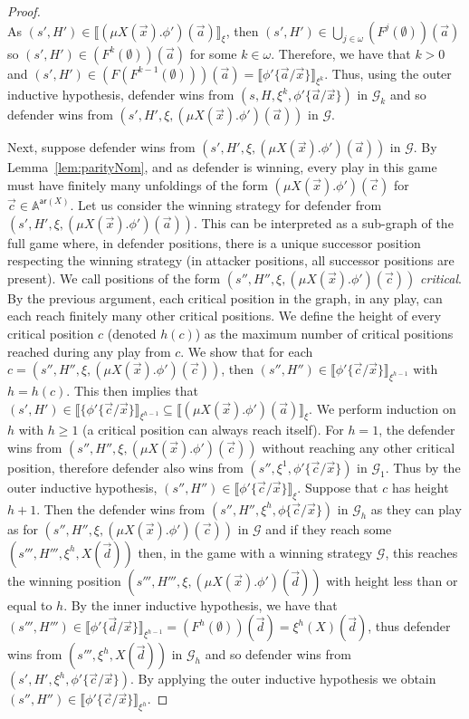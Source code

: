 \documentclass[10pt,a4paper]{article}
\theoremstyle{definition}
\theoremstyle{remark}
\newcommand\sem[2][\xi]{\llbracket#2\rrbracket_{#1}}
\newcommand\Gcal{\mathcal{G}}
\newcommand\Atoms{\mathbb{A}}
\newcommand\ar{\mathsf{ar}}
\begin{document}
\begin{proof}
	\\
	As $(s', H') \in \sem{(\mu X(\vec x).\phi')(\vec a)}$, then $(s', H') \in \bigcup_{j \in \omega} (F^j(\emptyset))(\vec a)$ so $(s', H') \in (F^k(\emptyset))(\vec a)$ for some $k \in \omega$. 
	Therefore, we have that $k > 0$ and $(s', H') \in (F(F^{k - 1}(\emptyset)))(\vec a) = \sem[\xi^k]{\phi'\{\vec a / \vec x\}}$.
	Thus, using the outer inductive hypothesis, defender wins from $(s, H, \xi^k, \phi'\{\vec a / \vec x\})$ in $\Gcal_k$ and so defender wins from $(s', H', \xi, (\mu X(\vec x).\phi')(\vec a))$ in $\Gcal$.
	
	Next, suppose defender wins from $(s', H', \xi, (\mu X(\vec x).\phi')(\vec a))$ in $\Gcal$. 
	By Lemma~\ref{lem:parityNom}, and as defender is winning, every play in this game must have finitely many unfoldings of the form $(\mu X(\vec x).\phi')(\vec c)$ for $\vec c \in \Atoms^{\ar(X)}$.
	Let us consider the winning strategy for defender from $(s', H', \xi, (\mu X(\vec x).\phi')(\vec a))$.
	This can be interpreted as a sub-graph of the full game where, in defender positions, there is a unique successor position respecting the winning strategy (in attacker positions, all successor positions are present). 
	We call positions of the form $(s'', H'', \xi, (\mu X(\vec x).\phi')(\vec c))$ \emph{critical}. 
	By the previous argument, each critical position in the graph, in any play, can each reach finitely many other critical positions. 
	We define the height of every critical position $c$ (denoted $h(c)$) as the maximum number of critical positions reached during any play from $c$. 
	We show that for each $c = (s'', H'', \xi, (\mu X(\vec x).\phi')(\vec c))$, then $(s'', H'')\in \sem[\xi^{h-1}]{\phi'\{\vec c / \vec x\}}$ with $h = h(c)$. 
	This then implies that $(s', H') \in \sem[\xi^{h - 1}]{\{\phi'\{\vec c / \vec x\}} \subseteq \sem{(\mu X(\vec x).\phi')(\vec a)}$.
	We perform induction on $h$ with $h \ge 1$ (a critical position can always reach itself). 
	For $h = 1$, the defender wins from $(s'',H'', \xi, (\mu X(\vec x).\phi')(\vec c))$ without reaching any other critical position, therefore defender also wins from $(s'', \xi^1, \phi'\{\vec c / \vec x\})$ in $\Gcal_1$.
	Thus by the outer inductive hypothesis, $(s'', H'') \in \sem{\phi'\{\vec c / \vec x\}}$.
	Suppose that $c$ has height $h + 1$. 
	Then the defender wins from $(s'', H'', \xi^h, \phi\{\vec c / \vec x\})$ in $\Gcal_h$ as they can play as for $(s'',H'', \xi, (\mu X(\vec x).\phi')(\vec c))$ in $\Gcal$ and if they reach some $(s''', H''', \xi^h, X(\vec d))$ then, in the game with a winning strategy $\Gcal$, this reaches the winning position $(s''', H''', \xi, (\mu X(\vec x).\phi')(\vec d))$ with height less than or equal to $h$. 
	By the inner inductive hypothesis, we have that $(s''', H''')\in \sem[\xi^{h-1}]{\phi'\{\vec d / \vec x\}} = (F^h(\emptyset))(\vec d) = \xi^h(X)(\vec d)$, thus defender wins from $(s''', \xi^h, X(\vec d))$ in $\Gcal_h$ and so defender wins from $(s', H', \xi^h, \phi'\{\vec c / \vec x\})$. 
	By applying the outer inductive hypothesis we obtain $(s'', H'')\in \sem[\xi^h]{\phi'\{\vec c / \vec x\}}$.  
				

\end{proof}
\end{document}
